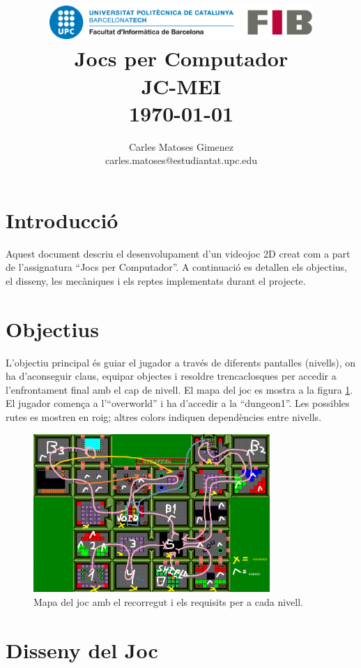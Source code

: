 \documentclass[a4paper,12pt]{article}
\title{
    \vspace{2cm}
    \includegraphics[width=0.75\textwidth]{fib.png} \\
    \vspace{1cm}
    \textbf{\Huge Jocs per Computador} \\
    \vspace{1cm}
    \large JC-MEI \\
    \vspace{0.5cm}
    \large \today
}
\author{
Carles Matoses Gimenez\\
\small carles.matoses@estudiantat.upc.edu
}
\date{}
\begin{document}
\maketitle
\thispagestyle{empty}
\newpage

\setcounter{page}{1}
\tableofcontents
\newpage

\section{Introducció}
Aquest document descriu el desenvolupament d'un videojoc 2D creat com a part de l'assignatura ``Jocs per Computador''. A continuació es detallen els objectius, el disseny, les mecàniques i els reptes implementats durant el projecte.

\section{Objectius}
L'objectiu principal és guiar el jugador a través de diferents pantalles (nivells), on ha d'aconseguir claus, equipar objectes i resoldre trencaclosques per accedir a l'enfrontament final amb el cap de nivell. El mapa del joc es mostra a la figura \ref{fig:mapa}. El jugador comença a l'``overworld'' i ha d'accedir a la ``dungeon1''. Les possibles rutes es mostren en roig; altres colors indiquen dependències entre nivells.

\begin{figure}[ht!]
    \centering
    \includegraphics[width=0.8\textwidth]{../imgs/recorregut.png}
    \caption{Mapa del joc amb el recorregut i els requisits per a cada nivell.}
    \label{fig:mapa}
\end{figure}

\section{Disseny del Joc}
\end{document}

